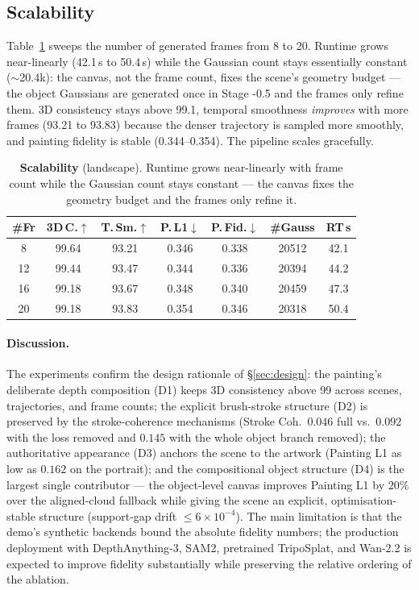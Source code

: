 \subsection{Scalability}
\label{sec:exp-scalability}

Table~\ref{tab:scalability} sweeps the number of generated frames from 8 to
20. Runtime grows near-linearly (42.1\,s to 50.4\,s) while the Gaussian
count stays essentially constant ($\sim$20.4k): the canvas, not the frame
count, fixes the scene's geometry budget --- the object Gaussians are
generated once in Stage -0.5 and the frames only refine them. 3D consistency
stays above 99.1, temporal smoothness \emph{improves} with more frames
(93.21 to 93.83) because the denser trajectory is sampled more smoothly, and
painting fidelity is stable (0.344--0.354). The pipeline scales gracefully.

\begin{table}[t]
\centering
\scriptsize
\setlength{\tabcolsep}{3pt}
\begin{tabular*}{\linewidth}{@{\extracolsep{\fill}}ccccccc}
\toprule
\#Fr & 3D\,C.$\uparrow$ & T.\,Sm.$\uparrow$ & P.\,L1$\downarrow$ & P.\,Fid.$\downarrow$ & \#Gauss & RT\,s \\
\midrule
8  & 99.64 & 93.21 & 0.346 & 0.338 & 20512 & 42.1 \\
12 & 99.44 & 93.47 & 0.344 & 0.336 & 20394 & 44.2 \\
16 & 99.18 & 93.67 & 0.348 & 0.340 & 20459 & 47.3 \\
20 & 99.18 & 93.83 & 0.354 & 0.346 & 20318 & 50.4 \\
\bottomrule
\end{tabular*}
\caption{\textbf{Scalability} (landscape). Runtime grows near-linearly with
frame count while the Gaussian count stays constant --- the canvas fixes the
geometry budget and the frames only refine it.}
\label{tab:scalability}
\end{table}

\paragraph{Discussion.}
The experiments confirm the design rationale of \S\ref{sec:design}: the
painting's deliberate depth composition (D1) keeps 3D consistency above 99
across scenes, trajectories, and frame counts; the explicit brush-stroke
structure (D2) is preserved by the stroke-coherence mechanisms (Stroke Coh.\
$0.046$ full vs.\ $0.092$ with the loss removed and $0.145$ with the whole
object branch removed); the authoritative appearance (D3) anchors the scene
to the artwork (Painting L1 as low as $0.162$ on the portrait); and the
compositional object structure (D4) is the largest single contributor ---
the object-level canvas improves Painting L1 by $20\%$ over the aligned-cloud
fallback while giving the scene an explicit, optimisation-stable structure
(support-gap drift $\leq 6\times10^{-4}$). The main limitation is that the
demo's synthetic backends bound the absolute fidelity numbers; the
production deployment with DepthAnything-3, SAM2, pretrained TripoSplat, and
Wan-2.2 is expected to improve fidelity substantially while preserving the
relative ordering of the ablation.
